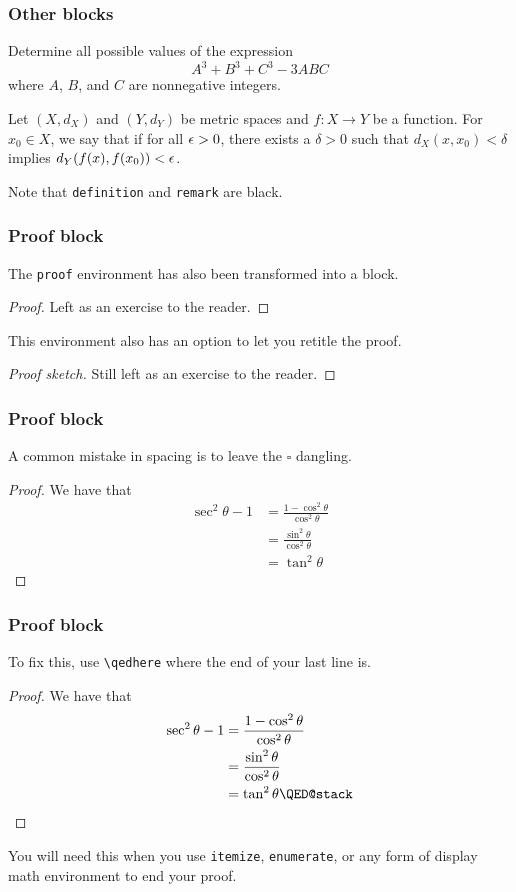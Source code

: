 \documentclass[mathserif]{beamer}
\begin{document}
\begin{frame}\frametitle{Other blocks}
	\begin{problem}
		Determine all possible values of the expression
		\[
			A^3+B^3+C^3-3ABC
		\]
		where $A$, $B$, and $C$ are nonnegative integers.
	\end{problem}
	\begin{definition}[Continuity]
		Let $(X,d_X)$ and $(Y,d_Y)$ be metric spaces and $f\colon X\to Y$ be a function. For $x_0\in X$, we say that  if for all $\epsilon>0$, there exists a $\delta>0$ such that $d_X(x,x_0)<\delta$ implies $d_Y(f(x),f(x_0))<\epsilon$.
	\end{definition}
	Note that \texttt{definition} and \texttt{remark} are black.
\end{frame}

\begin{frame}\frametitle{Proof block}
	The \texttt{proof} environment has also been transformed into a block.
	\begin{proof}
		Left as an exercise to the reader.
	\end{proof}
	\pause
	This environment also has an option to let you retitle the proof.
	\begin{proof}[Proof sketch]
		Still left as an exercise to the reader.
	\end{proof}
\end{frame}

\begin{frame}\frametitle{Proof block}
	A common mistake in spacing is to leave the $\square$ dangling.
	\begin{proof}
		We have that
		\begin{align*}
			\sec^2\theta-1 &= \frac{1-\cos^2\theta}{\cos^2\theta} \\
			&= \frac{\sin^2\theta}{\cos^2\theta} \\
			&= \tan^2\theta
		\end{align*}
	\end{proof}
\end{frame}

\begin{frame}[fragile]\frametitle{Proof block}
	To fix this, use \verb|\qedhere| where the end of your last line is.
	\begin{proof}
		We have that
		\begin{align*}
			\sec^2\theta-1 &= \frac{1-\cos^2\theta}{\cos^2\theta} \\
			&= \frac{\sin^2\theta}{\cos^2\theta} \\
			&= \tan^2\theta
			\qedhere
		\end{align*}
	\end{proof}
	\pause
	You will need this when you use \texttt{itemize}, \texttt{enumerate}, or any form of display math environment to end your proof.
\end{frame}
\end{document}
